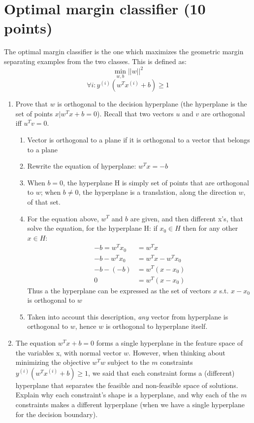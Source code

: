 \documentclass{article}
\newcommand{\ith}{^{(i)}}
\begin{document}
\begin{enumerate}
\begin{table}[h!]
\begin{center}
\begin{tabular}{l l l}
			\end{tabular}
			\end{center}
		\end{table}	
	\end{enumerate}

\pagebreak
\section{Optimal margin classifier (10 points)}
The optimal margin classifier is the one which maximizes the geometric margin separating examples from
the two classes. This is defined as:
$$ \min_{w,b} ||w||^2  $$
$$ \forall i: y\ith (w^Tx\ith +b) \ge 1  $$
\begin{enumerate}
	\item Prove that $w$ is orthogonal to the decision hyperplane (the hyperplane is the set of points ${x|w^Tx+b=0}$). Recall that two vectors $u$ and $v$ are orthogonal iff $u^Tv= 0$.
	\begin{enumerate}
		\item Vector is orthogonal to a plane if it is orthogonal to a vector that belongs to a plane
		\item Rewrite the equation of hyperplane: $w^Tx = -b$
		\item When $b=0$, the hyperplane H is simply set of points that are orthogonal to $w$; when $b\neq 0$, the hyperplane is a translation, along the direction $w$, of that set. 
		\item For the equation above, $w^T$ and $b$ are given, and then different x's, that solve the equation, for the hyperplane H: if $x_0 \in H$ then for any other $x \in H$:
		\begin{align*}
		-b = w^Tx_0 &= w^Tx\\
		-b - w^Tx_0 &= w^Tx - w^Tx_0\\
		-b - (-b) &= w^T(x - x_0)\\
		0 &= w^T(x - x_0)
		\end{align*}
		Thus a the hyperplane can be expressed as the set of vectors $x$ s.t. $x-x_0$ is orthogonal to $w$
		\item Taken into account this description, \textit{any} vector from hyperplane is orthogonal to $w$, hence $w$ is orthogonal to hyperplane itself.
	\end{enumerate}
	
	\item The equation $w^Tx+b=0$ forms a single hyperplane in the feature space of the variables x, with normal
	vector $w$. However, when thinking about minimizing the objective $w^Tw$ subject to the $m$ constraints
	$y\ith (w^Tx\ith +b) \ge 1$, we said that each constraint forms a (different) hyperplane that separates the
	feasible and non-feasible space of solutions. Explain why each constraint's shape is a hyperplane, and
	why each of the $m$ constraints makes a different hyperplane (when we have a single hyperplane for the
	decision boundary).
	

\end{enumerate}
\end{document}
